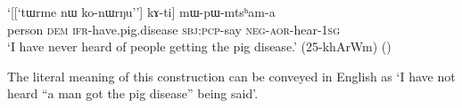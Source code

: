 \begin{exe}
\ex \label{ex:konWrNu.kAti}
\gll `[[`tɯrme nɯ ko-nɯrŋu''] kɤ-ti] mɯ-pɯ-mtsʰam-a \\
person \textsc{dem} \textsc{ifr}-have.pig.disease \textsc{sbj}:\textsc{pcp}-say \textsc{neg}-\textsc{aor}-hear-\textsc{1sg} \\
\glt `I have never heard of people getting the pig disease.' (25-khArWm)
()
\end{exe} 

The literal meaning of this construction can be conveyed in English as `I have not heard ``a man got the pig disease'' being said'.
